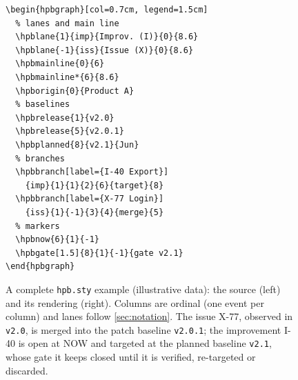 \begin{figure}[tbp]
  \centering
  \begin{minipage}[c]{0.41\linewidth}
\begin{lstlisting}[style=hpblatex,basicstyle=\ttfamily\scriptsize,
  moretexcs={hpbgate,hpbtarget}]
\begin{hpbgraph}[col=0.7cm, legend=1.5cm]
  % lanes and main line
  \hpblane{1}{imp}{Improv. (I)}{0}{8.6}
  \hpblane{-1}{iss}{Issue (X)}{0}{8.6}
  \hpbmainline{0}{6}
  \hpbmainline*{6}{8.6}
  \hpborigin{0}{Product A}
  % baselines
  \hpbrelease{1}{v2.0}
  \hpbrelease{5}{v2.0.1}
  \hpbplanned{8}{v2.1}{Jun}
  % branches
  \hpbbranch[label={I-40 Export}]
    {imp}{1}{1}{2}{6}{target}{8}
  \hpbbranch[label={X-77 Login}]
    {iss}{1}{-1}{3}{4}{merge}{5}
  % markers
  \hpbnow{6}{1}{-1}
  \hpbgate[1.5]{8}{1}{-1}{gate v2.1}
\end{hpbgraph}
\end{lstlisting}
  \end{minipage}\hfill
  \begin{minipage}[c]{0.57\linewidth}
    \centering
    \begin{hpbgraph}[col=0.7cm, legend=1.5cm]
    \end{hpbgraph}
  \end{minipage}
  \caption{A complete \texttt{hpb.sty} example (illustrative data): the
    source (left) and its rendering (right). Columns are ordinal
    (one event per column) and lanes follow \cref{sec:notation}. The issue X-77,
    observed in \texttt{v2.0}, is merged into the patch baseline
    \texttt{v2.0.1}; the improvement I-40 is open at NOW and targeted at the
    planned baseline \texttt{v2.1}, whose gate it keeps closed until it is
    verified, re-targeted or discarded.}
  \label{fig:package-example}
\end{figure}

